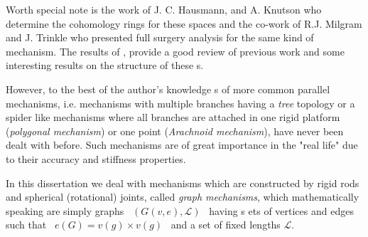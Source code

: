 Worth special note is the work of J. C. Hausmann, and A. Knutson
\cite{HK} who determine the cohomology rings for these spaces and
the co-work of R.J. Milgram and J. Trinkle \cite{MT1} who
presented full surgery analysis for the same kind of mechanism.
The results of \cite{KM}, provide a good review of previous work
and some interesting results on the structure of these \cspace s.

However, to the best of the author's knowledge \cspace s of more
common parallel mechanisms, i.e. mechanisms with multiple branches
having a \emph{tree} topology or a spider like mechanisms where
all branches are attached in one rigid platform (\emph{polygonal
mechanism}) or one point (\emph{Arachnoid mechanism}), have never
been dealt with before. Such mechanisms are of great importance in
the "real life" due to their accuracy and stiffness properties.

In this dissertation we deal with mechanisms which are constructed
by rigid rods and spherical (rotational)  joints, called
\emph{graph mechanisms}, which mathematically speaking are simply
graphs \ $(G(v,e),\mathcal{L})$ \ having s ets of vertices and
edges such that \ $e(G)=v(g)\times v(g)$ \ and a set of fixed
lengths $\mathcal{L}$.

